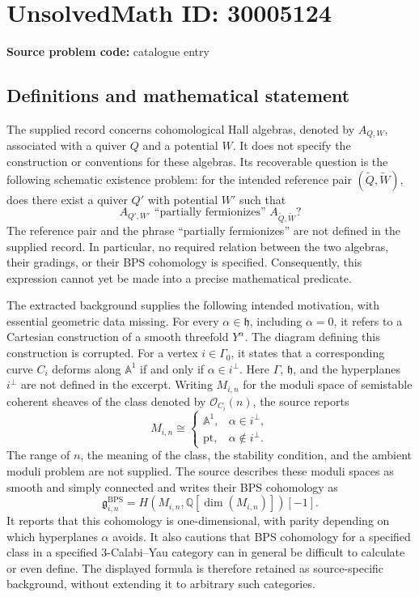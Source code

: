 \documentclass[11pt]{article}
\begin{document}
\section*{UnsolvedMath ID: 30005124}
\textbf{Source problem code:} catalogue entry
\subsection{Definitions and mathematical statement}
The supplied record concerns cohomological Hall algebras, denoted by \(A_{Q,W}\), associated with a quiver \(Q\) and a potential \(W\). It does not specify the construction or conventions for these algebras. Its recoverable question is the following schematic existence problem: for the intended reference pair \((\widetilde Q,\widetilde W)\), does there exist a quiver \(Q'\) with potential \(W'\) such that
\[
A_{Q',W'}\text{ ``partially fermionizes'' }A_{\widetilde Q,\widetilde W}?
\]
The reference pair and the phrase ``partially fermionizes'' are not defined in the supplied record. In particular, no required relation between the two algebras, their gradings, or their BPS cohomology is specified. Consequently, this expression cannot yet be made into a precise mathematical predicate.

The extracted background supplies the following intended motivation, with essential geometric data missing. For every \(\alpha\in\mathfrak h\), including \(\alpha=0\), it refers to a Cartesian construction of a smooth threefold \(Y^\alpha\). The diagram defining this construction is corrupted. For a vertex \(i\in\Gamma_0\), it states that a corresponding curve \(C_i\) deforms along \(\mathbb A^1\) if and only if \(\alpha\in i^\perp\). Here \(\Gamma\), \(\mathfrak h\), and the hyperplanes \(i^\perp\) are not defined in the excerpt. Writing \(M_{i,n}\) for the moduli space of semistable coherent sheaves of the class denoted by \(\mathcal O_{C_i}(n)\), the source reports
\[
M_{i,n}\cong
\begin{cases}
\mathbb A^1,&\alpha\in i^\perp,\\
\mathrm{pt},&\alpha\notin i^\perp.
\end{cases}
\]
The range of \(n\), the meaning of the class, the stability condition, and the ambient moduli problem are not supplied. The source describes these moduli spaces as smooth and simply connected and writes their BPS cohomology as
\[
\mathfrak g^{\mathrm{BPS}}_{i,n}
=H\!\left(M_{i,n},\mathbb Q[\dim(M_{i,n})]\right)[-1].
\]
It reports that this cohomology is one-dimensional, with parity depending on which hyperplanes \(\alpha\) avoids. It also cautions that BPS cohomology for a specified class in a specified \(3\)-Calabi--Yau category can in general be difficult to calculate or even define. The displayed formula is therefore retained as source-specific background, without extending it to arbitrary such categories.
\end{document}
